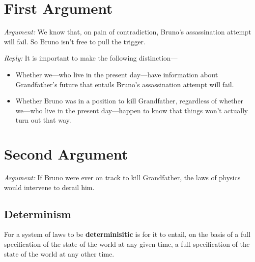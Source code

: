 \documentclass[12pt]{extarticle}
\begin{document}
\section{First Argument}

\emph{Argument:} We know that, on pain of contradiction, Bruno's assassination attempt will fail. So Bruno isn't free to pull the trigger.


\vspace{3mm}
\noindent
\emph{Reply:} It is important to make the following distinction---

\begin{itemize}

\item Whether we---who live in the present day---have information about Grandfather's future that entails Bruno's assassination attempt will fail. 

\item Whether Bruno was in a position to kill Grandfather, regardless of whether we---who live in the present day---happen to know that things won't actually turn out that way.

\end{itemize}




\section{Second Argument}

\emph{Argument:} If Bruno were ever on track to kill Grandfather, the laws of physics would intervene to derail him.















\subsection{Determinism}

For a system of laws to be \textbf{determinisitic} is for it to entail, on the basis of a full specification of the state of the world at any given time, a full specification of the state of the world at any other time.
\end{document}
